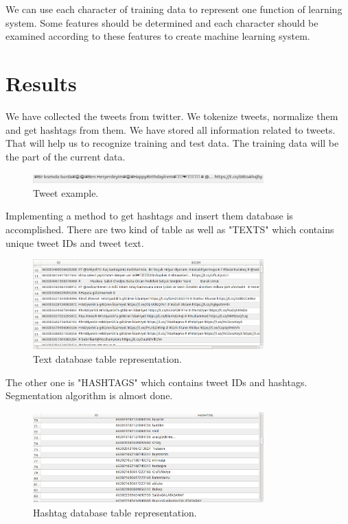 \documentclass[12pt]{comjnl}
\begin{document}
We can use each character of training data to represent one function of learning system. Some
features should be determined and each character should be examined according to these features
to create machine learning system.

\section{Results}
We have collected the tweets from twitter. We tokenize tweets, normalize them and get 
hashtags from them. We have stored all information related to tweets. That will help us to recognize training and test data. The training data will be the part of the current data.

\begin{figure}
\centering
\includegraphics[width=3.5in]{tweet.png}
\caption{Tweet example.}\label{fig:Tweet}
\end{figure}

Implementing a method to get hashtags and insert them database is 
accomplished. There are two kind of table as well as "TEXTS" which contains unique tweet IDs
and tweet text.

\begin{figure}
\centering
\includegraphics[width=3.5in]{text.png}
\caption{Text database table representation.}\label{fig:Tweet}
\end{figure}

The other one is "HASHTAGS" which contains tweet IDs and hashtags. Segmentation algorithm
is almost done.

\begin{figure}
\centering
\includegraphics[width=3.5in]{hashtag.png}
\caption{Hashtag database table representation.}\label{fig:Hashtag}
\end{figure}
\end{document}
